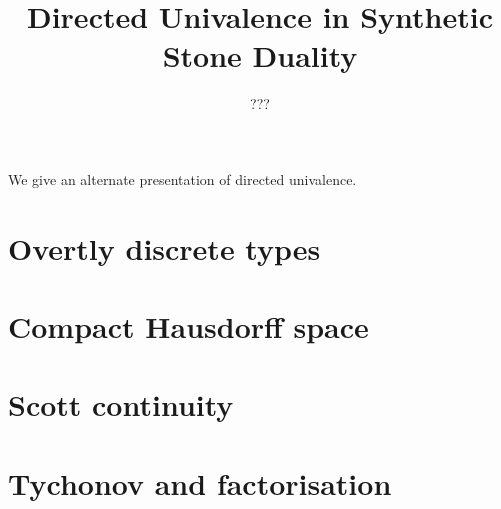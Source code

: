 \documentclass{../util/zariski}
\title{Directed Univalence in Synthetic Stone Duality}
\begin{document}
\author{???}

\maketitle

We give an alternate presentation of directed univalence.


\tableofcontents

\section{Overtly discrete types}


\section{Compact Hausdorff space}


\section{Scott continuity}


\section{Tychonov and factorisation}


\printbibliography
\end{document}
